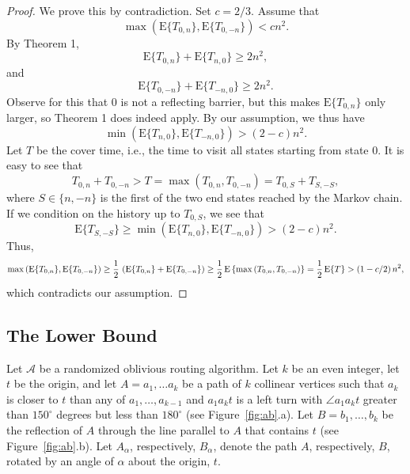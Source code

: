 \documentclass [letterpaper] {patmorin}
\newcommand{\EXP}{\mathrm{E}}
\begin{document}
\begin{proof}
We prove this by contradiction. Set $c = 2/3$. Assume that
\[
\max \left( \EXP \{ T_{0,n} \} , \EXP \{ T_{0,-n} \} \right) <  cn^2.
\]
By Theorem 1,
\[
 \EXP \{ T_{0,n} \}  +  \EXP \{ T_{n,0} \}  \ge 2n^2,
\]
and
\[
 \EXP \{ T_{0,-n} \}  +  \EXP \{ T_{-n,0} \}  \ge 2n^2.
\]
Observe for this that $0$ is not a reflecting barrier, but this makes 
$ \EXP \{ T_{0,n} \}$ only larger, so Theorem 1 does indeed apply.
By our assumption, we thus have
\[
\min \left( \EXP \{ T_{n,0} \} ,  \EXP \{ T_{-n,0} \} \right) >  (2-c) n^2.
\]
Let $T$ be the cover time, i.e., the time to visit all states starting from state $0$. It is easy to see that
\[
T_{0,n} + T_{0,-n} > T = \max \left( T_{0,n} , T_{0,-n} \right)
  =  T_{0,S} + T_{S,-S},
\]
where $S \in \{ n, -n \}$ is the first of the two end states
reached by the Markov chain. If we condition on the history up to $T_{0,S}$,
we see that
\[
\EXP \{ T_{S,-S} \} \ge \min \left( \EXP \{ T_{n,0} \} ,  \EXP \{ T_{-n,0} \} \right) >  (2-c) n^2.
\]
Thus,
\[
\max \left( \EXP \{ T_{0,n} \} , \EXP \{ T_{0,-n} \} \right)
 \ge {1 \over 2} \, \left( \EXP \{ T_{0,n} \} + \EXP \{ T_{0,-n} \} \right)
 \ge {1 \over 2} \, \EXP \left\{ \max \left( T_{0,n} , T_{0,-n} \right) \right\} 
= {1 \over 2} \, \EXP \{ T \}
>  (1- c/2 ) \,  n^2 ,
\]
which contradicts our assumption.
\end{proof}


\subsection{The Lower Bound}
\label{sec:bound}

Let $\mathcal{A}$ be a randomized oblivious routing algorithm.  Let $k$
be an even integer, let $t$ be the origin, and let $A=a_1,\ldots a_k$ be
a path of $k$ collinear vertices such that $a_{k}$ is closer to $t$ than
any of $a_1,\ldots,a_{k-1}$ and $a_{1}a_{k}t$ is a left turn with $\angle
a_{1}a_{k}t$ greater than $150^\circ$ degrees but less than $180^\circ$ (see Figure~\ref{fig:ab}.a). Let
$B=b_1,\ldots,b_k$ be the reflection of $A$ through the line parallel
to $A$ that contains $t$ (see Figure~\ref{fig:ab}.b).  Let $A_\alpha$,
respectively, $B_\alpha$, denote the path $A$, respectively, $B$,
rotated by an angle of $\alpha$ about the origin, $t$.
\end{document}
